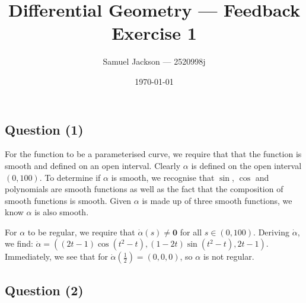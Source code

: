 \documentclass{article}
\title{Differential Geometry  --- Feedback Exercise 1}
\author{Samuel Jackson --- 2520998j}
\date{\today}
\begin{document}
\maketitle

\newcommand{\R}{\mathbb{R}}
\newcommand{\Z}{\mathbb{Z}}
\newcommand{\N}{\mathbb{N}}

\begin{center}
    \section*{Question (1)}
\end{center}

    \begin{flushleft}
        For the function to be a parameterised curve, we require that that the function is smooth and defined on an open interval. Clearly $\alpha$ is defined on the open interval $(0, 100)$. To determine if $\alpha$ is smooth, we recognise that $\sin$, $\cos$ and polynomials are smooth functions as well as the fact that the composition of smooth functions is smooth. Given $\alpha$ is made up of three smooth functions, we know $\alpha$ is also smooth. \newline  
        
        For $\alpha$ to be regular, we require that $\dot{\alpha}(s) \neq \mathbf{0}$ for all $s \in (0, 100)$. Deriving $\dot{\alpha}$, we find: $\dot{\alpha} = ((2t-1)\cos(t^2 - t), (1-2t)\sin(t^2-t), 2t-1)$. Immediately, we see that for $\dot{\alpha}(\frac{1}{2}) = (0, 0, 0)$, so $\alpha$ is not regular.  
    \end{flushleft}
\begin{center}
    \section*{Question (2)}
\end{center}
\end{document}
